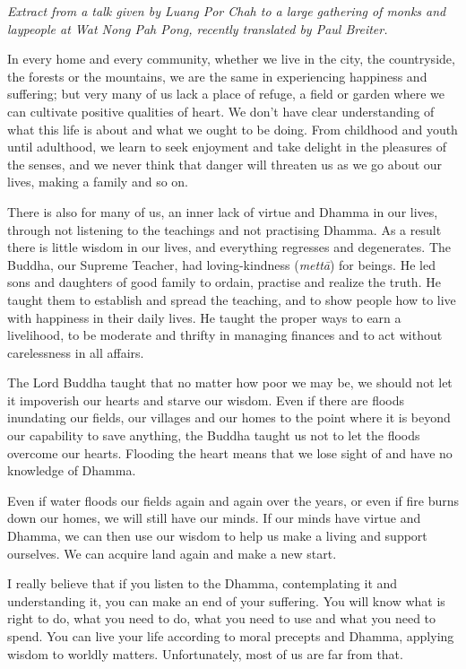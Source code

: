 
\emph{Extract from a talk given by Luang Por Chah to a large gathering
of monks and laypeople at Wat Nong Pah Pong, recently translated by Paul
Breiter.}

In every home and every community, whether we live in the city, the
countryside, the forests or the mountains, we are the same in
experiencing happiness and suffering; but very many of us lack a place
of refuge, a field or garden where we can cultivate positive qualities
of heart. We don't have clear understanding of what this life is about
and what we ought to be doing. From childhood and youth until adulthood, 
we learn to seek enjoyment and take delight in the pleasures of the
senses, and we never think that danger will threaten us as we go about
our lives, making a family and so on. 

There is also for many of us, an inner lack of virtue and Dhamma in our
lives, through not listening to the teachings and not practising Dhamma. 
As a result there is little wisdom in our lives, and everything
regresses and degenerates. The Buddha, our Supreme Teacher, had
loving-kindness (\emph{mettā}) for beings. He led sons and daughters of
good family to ordain, practise and realize the truth. He taught them to
establish and spread the teaching, and to show people how to live with
happiness in their daily lives. He taught the proper ways to earn a
livelihood, to be moderate and thrifty in managing finances and to act
without carelessness in all affairs. 

The Lord Buddha taught that no matter how poor we may be, we should not
let it impoverish our hearts and starve our wisdom. Even if there are
floods inundating our fields, our villages and our homes to the point
where it is beyond our capability to save anything, the Buddha taught us
not to let the floods overcome our hearts. Flooding the heart means that
we lose sight of and have no knowledge of Dhamma. 

Even if water floods our fields again and again over the years, or even
if fire burns down our homes, we will still have our minds. If our minds
have virtue and Dhamma, we can then use our wisdom to help us make a
living and support ourselves. We can acquire land again and make a new
start. 

I really believe that if you listen to the Dhamma, contemplating it and
understanding it, you can make an end of your suffering. You will know
what is right to do, what you need to do, what you need to use and what
you need to spend. You can live your life according to moral precepts
and Dhamma, applying wisdom to worldly matters. Unfortunately, most of
us are far from that. 

